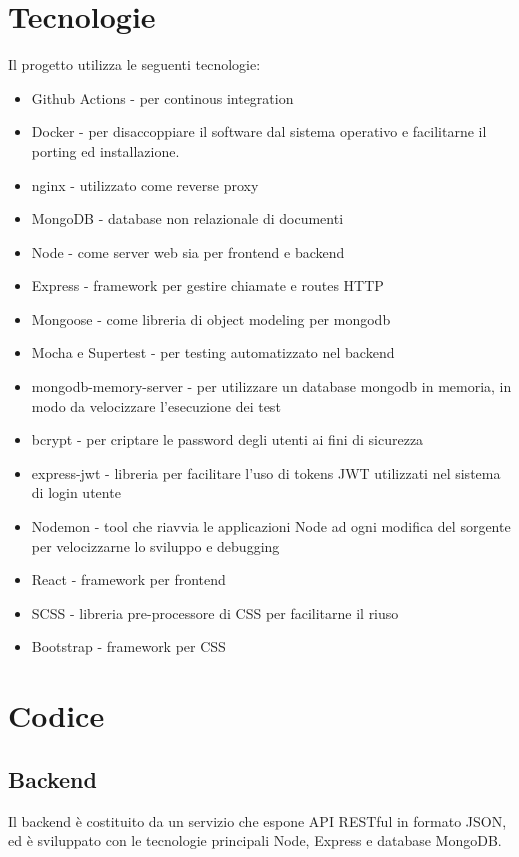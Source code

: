 \documentclass{report}
\begin{document}
\section{Tecnologie}
Il progetto utilizza le seguenti tecnologie:
\begin{itemize}
    \item Github Actions - per continous integration
    \item Docker - per disaccoppiare il software dal sistema operativo e facilitarne il porting ed installazione.
    \item nginx - utilizzato come reverse proxy
    \item MongoDB - database non relazionale di documenti
    \item Node - come server web sia per frontend e backend
    \item Express - framework per gestire chiamate e routes HTTP
    \item Mongoose - come libreria di object modeling per mongodb
    \item Mocha e Supertest - per testing automatizzato nel backend
    \item mongodb-memory-server - per utilizzare un database mongodb in memoria, in modo da velocizzare l'esecuzione dei test
    \item bcrypt - per criptare le password degli utenti ai fini di sicurezza
    \item express-jwt - libreria per facilitare l'uso di tokens JWT utilizzati nel sistema di login utente
    \item Nodemon - tool che riavvia le applicazioni Node ad ogni modifica del sorgente
    per velocizzarne lo sviluppo e debugging
    \item React - framework per frontend
    \item SCSS - libreria pre-processore di CSS per facilitarne il riuso
    \item Bootstrap - framework per CSS
\end{itemize}

\section{Codice}
\subsection{Backend}
Il backend è costituito da un servizio che espone API RESTful in formato JSON, ed è sviluppato con le tecnologie principali
Node, Express e database MongoDB.
\end{document}
